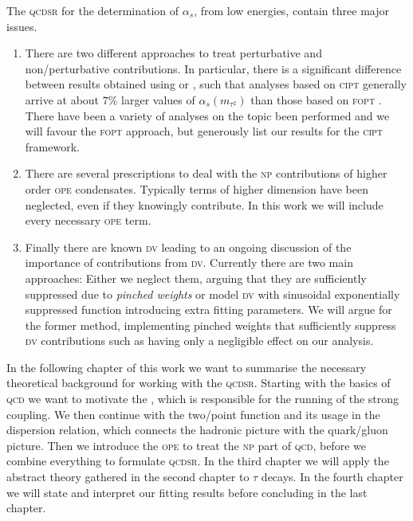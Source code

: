 \documentclass[../../index.tex]{subfiles}
\begin{document}
The \textsc{qcdsr} for the determination of \(\alpha_s\), from low energies,
contain three major issues.
\begin{enumerate}
\item There are two different approaches to treat perturbative and
  non\-/perturbative contributions. In particular, there is a significant
  difference between results obtained using  or ,
  such that analyses based on \textsc{cipt} generally arrive at about \(7\%\)
  larger values of \(\alpha_s(m_{\tau^2})\) than those based on \textsc{fopt}
  \cite{PDG2018}. There have been a variety of analyses on the topic been
  performed \cite{Pich2013,Caprini2009,Jamin2005} and we will favour the
  \textsc{fopt} approach, but generously list our results for the \textsc{cipt}
  framework.

\item There are several prescriptions to deal with the \textsc{np} contributions
  of higher order \textsc{ope} condensates. Typically terms of higher dimension
  have been neglected, even if they knowingly contribute. In this work we will
  include every necessary \textsc{ope} term.

\item Finally there are known \textsc{dv} leading to an ongoing discussion of
  the importance of contributions from \textsc{dv}. Currently there are two main
  approaches: Either we neglect them, arguing that they are sufficiently
  suppressed due to \textit{pinched weights} \cite{Pich2016} or model
  \textsc{dv} with sinusoidal exponentially suppressed function
  \cite{Cata2008,Boito2011a,Boito2014} introducing extra fitting parameters. We
  will argue for the former method, implementing pinched weights that
  sufficiently suppress \textsc{dv} contributions such as having only a
  negligible effect on our analysis.
\end{enumerate}

In the following chapter of this work we want to summarise the necessary theoretical
background for working with the \textsc{qcdsr}. Starting with the basics of
\textsc{qcd} we want to motivate the , which is responsible for the running of the strong coupling. We
then continue with the two\-/point function and its usage in the dispersion
relation, which connects the hadronic picture with the quark\-/gluon picture.
Then we introduce the \textsc{ope} to treat the \textsc{np} part of
\textsc{qcd}, before we combine everything to formulate \textsc{qcdsr}. In the
third chapter we will apply the abstract theory gathered in the second chapter
to \(\tau\) decays. In the fourth chapter we will state and interpret our fitting
results before concluding in the last chapter.
\end{document}
